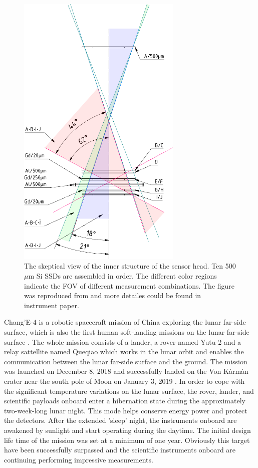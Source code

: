 \begin{figure}
    \centering
    \includegraphics[width = 0.7\textwidth, height = 0.5 \textheight]{images/change4_lnd-c9_trigger-cones-colored.pdf}
    \caption[The inner structure of LND sensor head]{The skeptical view of the inner structure of the sensor head. Ten 500 $\mu$m Si \acp{SSD} are assembled in order. The different color regions indicate the \ac{FOV} of different measurement combinations. The figure was reproduced from \citet{Wimmer-2020-LND} and more detailes could be found in instrument paper.}
    \label{Fig:LND_sensor_head}
\end{figure}
Chang'E-4 is a robotic spacecraft mission of China exploring the lunar far-side surface, which is also the first human soft-landing missions on the lunar far-side surface \citep{Li2021SSRv}. The whole mission consists of a lander, a rover named Yutu-2 and a relay sattellite named Queqiao which works in the lunar orbit and enables the communication between the lunar far-side surface and the ground. The mission was launched on December 8, 2018 and successfully landed on the Von K\`arm\`an crater near the south pole of Moon on January 3, 2019 \citep{Wu2019NatGe}. In order to cope with the significant temperature variations on the lunar surface, the rover, lander, and scientific payloads onboard enter a hibernation state during the approximately two-week-long lunar night. This mode helps conserve energy power and protect the detectors.  After the extended 'sleep' night, the instruments onboard are awakened by sunlight and start operating during the daytime. The initial design life time of the mission was set at a minimum of one year. Obviously this target have been successfully surpassed and the scientific instruments onboard are continuing performing impressive measurements.

